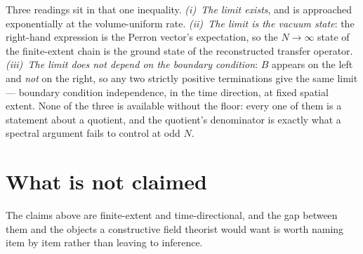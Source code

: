 \documentclass[11pt]{article}
\begin{document}
Three readings sit in that one inequality.  \emph{(i)~The limit
exists}, and is approached exponentially at the volume-uniform rate.
\emph{(ii)~The limit is the vacuum state}: the right-hand expression is
the Perron vector's expectation, so the $N\to\infty$ state of the
finite-extent chain is the ground state of the reconstructed transfer
operator.  \emph{(iii)~The limit does not depend on the boundary
condition}: $B$ appears on the left and \emph{not} on the right, so any
two strictly positive terminations give the same limit --- boundary
condition independence, in the time direction, at fixed spatial extent.
None of the three is available without the floor: every one of them is
a statement about a quotient, and the quotient's denominator is exactly
what a spectral argument fails to control at odd $N$.

\section{What is not claimed}\label{sec:honesty}
The claims above are finite-extent and time-directional, and the gap
between them and the objects a constructive field theorist would want
is worth naming item by item rather than leaving to inference.
\end{document}
